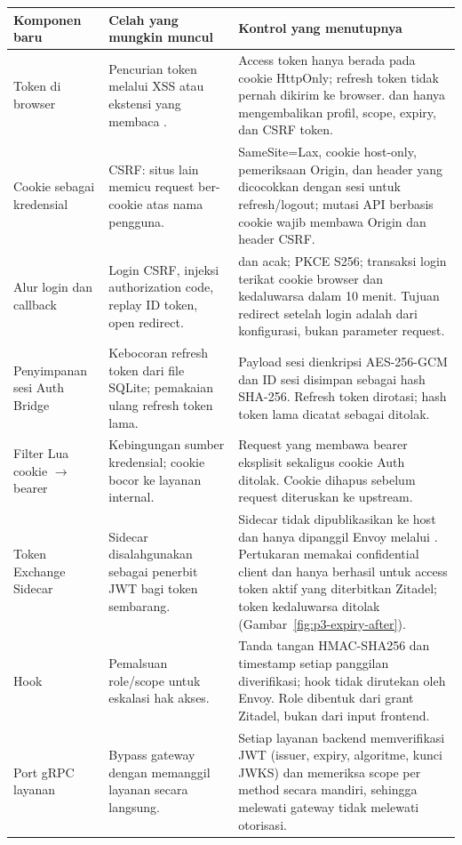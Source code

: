 \begin{table}[H]\small
\begin{tabularx}{\textwidth}{@{}P{3.0cm}YY@{}}
\toprule \textbf{Komponen baru} & \textbf{Celah yang mungkin muncul} & \textbf{Kontrol yang menutupnya}\\\midrule
Token di browser & Pencurian token melalui XSS atau ekstensi yang membaca . & Access token hanya berada pada cookie HttpOnly; refresh token tidak pernah dikirim ke browser.  dan  hanya mengembalikan profil, scope, expiry, dan CSRF token.\\
Cookie sebagai kredensial & CSRF: situs lain memicu request ber-cookie atas nama pengguna. & SameSite=Lax, cookie host-only, pemeriksaan Origin, dan header  yang dicocokkan dengan sesi untuk refresh/logout; mutasi API berbasis cookie wajib membawa Origin dan header CSRF.\\
Alur login  dan callback & Login CSRF, injeksi authorization code, replay ID token, open redirect. &  dan  acak; PKCE S256; transaksi login terikat cookie browser dan kedaluwarsa dalam 10 menit. Tujuan redirect setelah login adalah  dari konfigurasi, bukan parameter request.\\
Penyimpanan sesi Auth Bridge & Kebocoran refresh token dari file SQLite; pemakaian ulang refresh token lama. & Payload sesi dienkripsi AES-256-GCM dan ID sesi disimpan sebagai hash SHA-256. Refresh token dirotasi; hash token lama dicatat sebagai ditolak.\\
Filter Lua cookie $\rightarrow$ bearer & Kebingungan sumber kredensial; cookie bocor ke layanan internal. & Request yang membawa bearer eksplisit sekaligus cookie Auth ditolak. Cookie dihapus sebelum request diteruskan ke upstream.\\
Token Exchange Sidecar & Sidecar disalahgunakan sebagai penerbit JWT bagi token sembarang. & Sidecar tidak dipublikasikan ke host dan hanya dipanggil Envoy melalui . Pertukaran memakai confidential client dan hanya berhasil untuk access token aktif yang diterbitkan Zitadel; token kedaluwarsa ditolak (Gambar~\ref{fig:p3-expiry-after}).\\
Hook  & Pemalsuan role/scope untuk eskalasi hak akses. & Tanda tangan HMAC-SHA256 dan timestamp setiap panggilan diverifikasi; hook tidak dirutekan oleh Envoy. Role dibentuk dari grant Zitadel, bukan dari input frontend.\\
Port gRPC layanan & Bypass gateway dengan memanggil layanan secara langsung. & Setiap layanan backend memverifikasi JWT (issuer, expiry, algoritme, kunci JWKS) dan memeriksa scope per method secara mandiri, sehingga melewati gateway tidak melewati otorisasi.\\

\end{tabularx}
\end{table}
